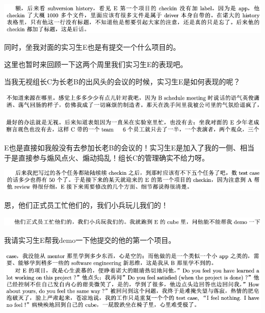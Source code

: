 \documentclass[9pt, b5paper]{article}
\begin{document}
\begin{center}
\includegraphics[width=.9\linewidth]{./pic/backups_plans_20210507_095519.png}
\end{center}

同时，坐我对面的实习生E也是有提交一个什么项目的。 

这里也暂时来回顾一下这两个周里我们实习生E的表现吧。

当我无视组长C为长老B的出风头的会议的时候，实习生E是如何表现的呢？

\begin{center}
\includegraphics[width=.9\linewidth]{./pic/backups_plans_20210507_095110.png}
\end{center}

\begin{center}
\includegraphics[width=.9\linewidth]{./pic/backups_plans_20210507_095131.png}
\end{center}

E也是直接如我般没有去参加长老B的会议的！实习生E是加入了我的一侧、相当于是直接参与煽风点火、煽动捣乱！组长C的管理确实不给力呀。 

\begin{center}
\includegraphics[width=.9\linewidth]{./pic/backups_plans_20210507_094737.png}
\end{center}

恩，他们正式员工忙他们的，我们小兵玩儿我们的！

\begin{center}
\includegraphics[width=.9\linewidth]{./pic/backups_plans_20210507_104400.png}
\end{center}

我请实习生E帮我demo一下他提交的他的第一个项目。

\begin{center}
\includegraphics[width=.9\linewidth]{./pic/backups_plans_20210507_104525.png}
\end{center}
\end{document}
